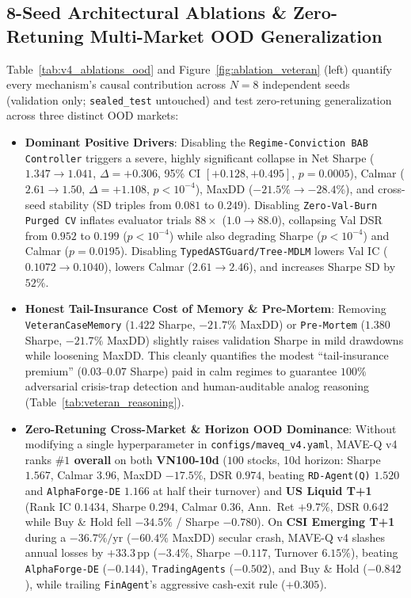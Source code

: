 \documentclass[11pt]{article}
\begin{document}
\subsection{8-Seed Architectural Ablations \& Zero-Retuning Multi-Market OOD Generalization}
Table~\ref{tab:v4_ablations_ood} and Figure~\ref{fig:ablation_veteran} (left) quantify every mechanism's causal contribution across $N=8$ independent seeds (validation only; \texttt{sealed\_test} untouched) and test zero-retuning generalization across three distinct OOD markets:
\begin{itemize}[leftmargin=1.4em]
  \item \textbf{Dominant Positive Drivers}: Disabling the \texttt{Regime-Conviction BAB Controller} triggers a severe, highly significant collapse in Net Sharpe ($1.347 \rightarrow 1.041$, $\Delta = +0.306$, 95\% CI $[+0.128, +0.495]$, $p=0.0005$), Calmar ($2.61 \rightarrow 1.50$, $\Delta = +1.108$, $p < 10^{-4}$), MaxDD ($-21.5\% \rightarrow -28.4\%$), and cross-seed stability (SD triples from $0.081$ to $0.249$). Disabling \texttt{Zero-Val-Burn Purged CV} inflates evaluator trials $88\times$ ($1.0 \rightarrow 88.0$), collapsing Val DSR from $0.952$ to $0.199$ ($p < 10^{-4}$) while also degrading Sharpe ($p < 10^{-4}$) and Calmar ($p=0.0195$). Disabling \texttt{TypedASTGuard/Tree-MDLM} lowers Val IC ($0.1072 \rightarrow 0.1040$), lowers Calmar ($2.61 \rightarrow 2.46$), and increases Sharpe SD by $52\%$.
  \item \textbf{Honest Tail-Insurance Cost of Memory \& Pre-Mortem}: Removing \texttt{VeteranCaseMemory} ($1.422$ Sharpe, $-21.7\%$ MaxDD) or \texttt{Pre-Mortem} ($1.380$ Sharpe, $-21.7\%$ MaxDD) slightly raises validation Sharpe in mild drawdowns while loosening MaxDD. This cleanly quantifies the modest ``tail-insurance premium'' ($0.03$--$0.07$ Sharpe) paid in calm regimes to guarantee $100\%$ adversarial crisis-trap detection and human-auditable analog reasoning (Table~\ref{tab:veteran_reasoning}).
  \item \textbf{Zero-Retuning Cross-Market \& Horizon OOD Dominance}: Without modifying a single hyperparameter in \texttt{configs/maveq\_v4.yaml}, MAVE-Q v4 ranks \textbf{$\#1$ overall} on both \textbf{VN100-10d} ($100$ stocks, 10d horizon: Sharpe $1.567$, Calmar $3.96$, MaxDD $-17.5\%$, DSR $0.974$, beating \texttt{RD-Agent(Q)} $1.520$ and \texttt{AlphaForge-DE} $1.166$ at half their turnover) and \textbf{US Liquid T+1} (Rank IC $0.1434$, Sharpe $0.294$, Calmar $0.36$, Ann.\ Ret $+9.7\%$, DSR $0.642$ while Buy \& Hold fell $-34.5\%$ / Sharpe $-0.780$). On \textbf{CSI Emerging T+1} during a $-36.7\%/\text{yr}$ ($-60.4\%$ MaxDD) secular crash, MAVE-Q v4 slashes annual losses by $+33.3$\,pp ($-3.4\%$, Sharpe $-0.117$, Turnover $6.15\%$), beating \texttt{AlphaForge-DE} ($-0.144$), \texttt{TradingAgents} ($-0.502$), and Buy \& Hold ($-0.842$), while trailing \texttt{FinAgent}'s aggressive cash-exit rule ($+0.305$).
\end{itemize}
\end{document}
